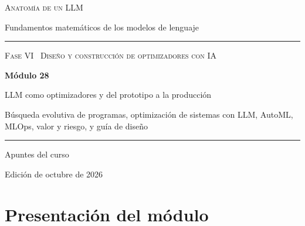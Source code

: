 \documentclass[11pt,a4paper,twoside,openany]{book}
\begin{document}
\frontmatter
\begin{titlepage}
\centering
\vspace*{2.5cm}
{\large\scshape Anatomía de un LLM}\par
\vspace{0.4cm}
{\normalsize Fundamentos matemáticos de los modelos de lenguaje}\par
\vspace{2.2cm}
\rule{\textwidth}{0.8pt}\par\vspace{0.5cm}
{\small\scshape Fase VI \textperiodcentered\ Diseño y construcción de optimizadores con IA}\par\vspace{0.3cm}
{\Huge\bfseries Módulo 28\par}\vspace{0.3cm}
{\LARGE LLM como optimizadores y del prototipo a la producción\par}
\vspace{0.2cm}
{\large Búsqueda evolutiva de programas, optimización de sistemas con LLM, AutoML, MLOps, valor y riesgo, y guía de diseño\par}
\vspace{0.5cm}\rule{\textwidth}{0.4pt}\par
\vspace{1.6cm}
{\large Apuntes del curso}\par
\vfill
{\small Edición de octubre de 2026}\par
\end{titlepage}

\chapter*{Presentación del módulo}
\end{document}
